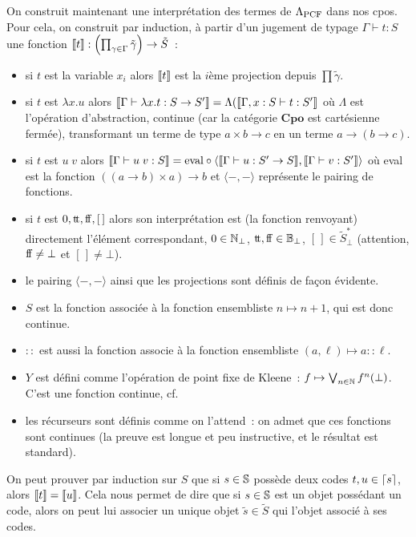 \documentclass{article}
\begin{document}
On construit maintenant une interprétation des termes de $\Lambda_{\mathrm{PCF}}$ dans nos cpos. Pour cela, on construit par induction, à partir d'un jugement de typage $\Gamma\vdash t : S$ une fonction $\llbracket t \rrbracket : \left(\prod_{\gamma \in \Gamma} \tilde\gamma\right) \to \tilde S$~:
\begin{itemize}
    \item si $t$ est la variable $x_i$ alors $\llbracket t \rrbracket$ est la $i$ème projection depuis $\prod \tilde \gamma$.
    \item si $t$ est $\lambda x.u$ alors $\llbracket \Gamma\vdash \lambda x. t : S \to S' \rrbracket = \Lambda(\llbracket \Gamma, x : S\vdash t : S' \rrbracket$ où $\Lambda$ est l'opération d'abstraction, continue (car la catégorie $\mathbf{Cpo}$ est cartésienne fermée), transformant un terme de type $a\times b \to c$ en un terme $a \to (b \to c)$.
    \item si $t$ est $u\;v$ alors $\llbracket \Gamma\vdash u\;v : S \rrbracket = \mathrm{eval}\circ \langle \llbracket \Gamma\vdash u : S' \to S \rrbracket, \llbracket \Gamma\vdash v : S' \rrbracket\rangle$ où eval est la fonction $((a\to b)\times a) \to b$ et $\langle -,-\rangle$ représente le pairing de fonctions.
    \item si $t$ est $0,\mathrm{t}\!\mathrm{t},\mathrm{f}\!\mathrm{f},[\,]$ alors son interprétation est (la fonction renvoyant) directement l'élément correspondant, $0 \in \mathbb{N}_\bot$, $\mathrm{t}\!\mathrm{t}, \mathrm{f}\!\mathrm{f} \in \mathbb{B}_\bot$, $[\,] \in \tilde S^*_\bot$ (attention, $\mathrm{f}\!\mathrm{f} \neq \bot$ et $[\,] \neq \bot$).
    \item le pairing $\langle -,-\rangle$ ainsi que les projections sont définis de façon évidente.
    \item $S$ est la fonction associée à la fonction ensembliste $n \mapsto n + 1$, qui est donc continue.
    \item $::$ est aussi la fonction associe à la fonction ensembliste $(a,\ell) \mapsto a :: \ell$.
    \item $Y$ est défini comme l'opération de point fixe de Kleene~: $f \mapsto \bigvee_{n \in \mathbb{N}} f^n(\bot)$. C'est une fonction continue, cf\cite{Amadio_Curien_1998}.
    \item les récurseurs sont définis comme on l'attend~: on admet que ces fonctions sont continues (la preuve est longue et peu instructive, et le résultat est standard).
\end{itemize}

On peut prouver par induction  sur $S$ que si $s \in \mathbb{S}$ possède deux codes $t,u \in \lceil s \rceil$, alors $\llbracket t \rrbracket = \llbracket u \rrbracket$. Cela nous permet de dire que si $s \in \mathbb{S}$ est un objet possédant un code, alors on peut lui associer un unique objet $\tilde s \in \tilde S$ qui l'objet associé à ses codes.
\end{document}
